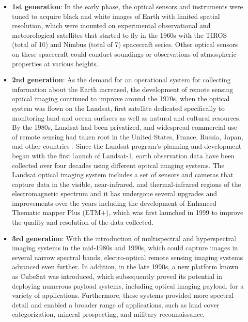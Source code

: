 \documentclass[final,5p,times,sort&compress,twocolumn]{elsarticle}
\begin{document}
\begin{itemize}
	\item \textbf{1st generation}: In the early phase, the optical sensors and instruments were tuned to acquire black and white images of Earth with limited spatial resolution, which were mounted on experimental observational and meteorological satellites that started to fly in the 1960s \cite{nicholas1999} with the TIROS (total of 10) and Nimbus (total of 7) spacecraft series. Other optical sensors on these spacecraft could conduct soundings or observations of atmospheric properties at various heights.
	\item \textbf{2nd generation}: As the demand for an operational system for collecting information about the Earth increased, the development of remote sensing optical imaging continued to improve around the 1970s, when the optical system was flown on the Landsat, first satellite dedicated specifically to monitoring land and ocean surfaces as well as natural and cultural resources. By the 1980s, Landsat had been privatized, and widespread commercial use of remote sensing had taken root in the United States, France, Russia, Japan, and other countries \cite{nicholas1999}. Since the Landsat program's planning and development began with the first launch of Landsat-1, earth observation data have been collected over four decades \cite{wulder2019current} using different optical imaging systems. The Landsat optical imaging system includes a set of sensors and cameras that capture data in the visible, near-infrared, and thermal-infrared regions of the electromagnetic spectrum and it has undergone several upgrades and improvements over the years including the development of Enhanced Thematic mapper Plus (ETM+), which was first launched in 1999 to improve the quality and resolution of the data collected. 
	\item \textbf{3rd generation}: With the introduction of multispectral and hyperspectral imaging systems in the mid-1980s and 1990s, which could capture images in several narrow spectral bands, electro-optical remote sensing imaging systems advanced even further. 
	In addition, in the late 1990s, a new platform known as CubeSat was introduced, which subsequently proved its potential \cite{poghosyan2017cubesat}  in deploying numerous payload systems, including optical imaging payload, for a variety of applications. Furthermore, these systems provided more spectral detail and enabled a broader range of applications, such as land cover categorization, mineral prospecting, and military reconnaissance. 

\end{itemize}
\end{document}
